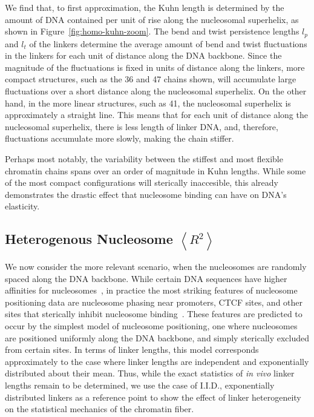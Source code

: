 \documentclass[%
 reprint,
superscriptaddress,
showpacs,preprintnumbers,
 amsmath,amssymb,
 aps,
 prl,
]{revtex4-1}
\newcommand{\RR}{\left\langle{}R^2\right\rangle{}}
\begin{document}
We find that, to first approximation, the Kuhn length is determined by the
    amount of DNA contained per unit of rise along the nucleosomal superhelix,
    as shown in Figure~\ref{fig:homo-kuhn-zoom}.
The bend and twist persistence lengths $l_p$ and $l_t$ of the linkers determine
    the average amount of bend and twist fluctuations in the linkers for each
    unit of distance along the DNA backbone.
Since the magnitude of the fluctuations is fixed in units of distance along the
    linkers, more compact structures, such as the \SI{36}{\basepair} and
    \SI{47}{\basepair} chains shown, will accumulate large fluctuations over a
    short distance along the nucleosomal superhelix.
On the other hand, in the more linear structures, such as \SI{41}{\basepair},
    the nucleosomal superhelix is approximately a straight line.
This means that for each unit of distance along the nucleosomal superhelix,
    there is less length of linker DNA, and, therefore, fluctuations accumulate
    more slowly, making the chain stiffer.

Perhaps most notably, the variability between the stiffest and most flexible
    chromatin chains spans over an order of magnitude in Kuhn lengths.
While some of the most compact configurations will sterically inaccesible, this
    already demonstrates the drastic effect that nucleosome binding can have on
    DNA's elasticity.

\subsection{\label{sec:homo-kuhn}Heterogenous Nucleosome $\RR$}

We now consider the more relevant scenario, when the nucleosomes are randomly
    spaced along the DNA backbone.
While certain DNA sequences have higher affinities for
    nucleosomes~\cite{something widom}, in practice the most striking features
    of nucleosome positioning data are nucleosome phasing near promoters, CTCF
    sites, and other sites that sterically inhibit nucleosome
    binding~\cite{widom1992}.
These features are predicted to occur by the simplest model of nucleosome
    positioning, one where nucleosomes are positioned uniformly along the DNA
    backbone, and simply sterically excluded from certain sites.
In terms of linker lengths, this model corresponds approximately to the case
    where linker lengths are independent and exponentially distributed about
    their mean.
Thus, while the exact statistics of \textit{in vivo} linker lengths remain to be
    determined, we use the case of I.I.D., exponentially distributed linkers as
    a reference point to show the effect of linker heterogeneity on the
    statistical mechanics of the chromatin fiber.
\end{document}
